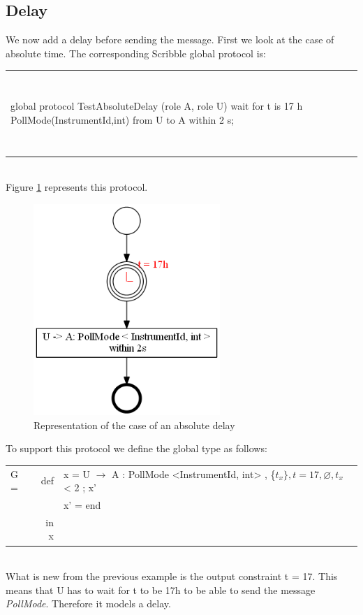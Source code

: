 \documentclass[a4paper,11pt,twoside]{report}
\begin{document}
\subsection{Delay}
We now add a delay before sending the message. First we look at the case of absolute time. The corresponding Scribble global protocol is:\\
\begin{tabular}{ll}
~&~\\
\begin{SJLISTING}
global protocol TestAbsoluteDelay (role A, role U) {
	wait for t is 17 h
	PollMode(InstrumentId,int) from U to A within 2 s;
}
\end{SJLISTING}
&\\
~&~\\
\end{tabular}\\
Figure \ref{fig:ad} represents this protocol.

\begin{figure}[h]
\begin{center}
\includegraphics[height=8cm]{TestAbsoluteDelay}\caption{Representation of the case of an absolute delay}\label{fig:ad}
\end{center}
\end{figure}

To support this protocol we define the global type as follows:\\
\begin{tabular}{lrl}
G = & def & x = U $\rightarrow$ A : PollMode <InstrumentId, int> , \{$t_{x}\}, t=17, \varnothing, t_{x}$ < 2  ;  x’\\
&& x’ = end\\
& in x&\\
\end{tabular}\\
What is new from the previous example is the output constraint t = 17. This means that U has to wait for t to be 17h to be able to send the message \emph{PollMode}. Therefore it models a delay.
\end{document}
